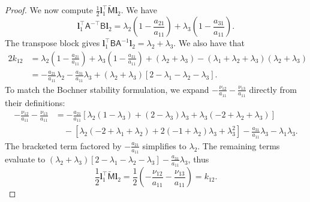 \documentclass{amsart}
\newcommand{\msfA}{\mathsf{A}}
\newcommand{\msfB}{\mathsf{B}}
\newcommand{\msfM}{\mathsf{M}}
\newcommand{\bfl}{\boldsymbol{l}}
\theoremstyle{definition}
\begin{document}
\begin{proof}
  We now compute $\frac{1}{2} \bfl_1^\top \tilde{\msfM} \bfl_2$. We have 
  \[
    \bfl_1^\top \msfA^{-\top} \msfB \bfl_2 = \lambda_2\left(1 - \frac{a_{21}}{a_{11}} \right) + \lambda_3\left(1 - \frac{a_{31}}{a_{11}} \right).
  \]
  The transpose block gives $\bfl_1^\top \msfB \msfA^{-1} \bfl_2 = \lambda_2 + \lambda_3$. We also have that
  \begin{align*}
    2 k_{12} &= \lambda_2\left(1 - \frac{a_{21}}{a_{11}}\right) + \lambda_3\left(1 - \frac{a_{31}}{a_{11}}\right) + (\lambda_2 + \lambda_3) - (\lambda_1+\lambda_2+\lambda_3)(\lambda_2+\lambda_3) \\
    &= -\frac{a_{21}}{a_{11}}\lambda_2 - \frac{a_{31}}{a_{11}}\lambda_3 + (\lambda_2+\lambda_3)\left[ 2 - \lambda_1 - \lambda_2 - \lambda_3 \right].
  \end{align*}
  To match the Bochner stability formulation, we expand $-\frac{\nu_{12}}{a_{11}} - \frac{\nu_{13}}{a_{11}}$ directly from their definitions:
  \begin{align*}
    -\frac{\nu_{12}}{a_{11}} - \frac{\nu_{13}}{a_{11}} &= -\frac{a_{21}}{a_{11}} \left[ \lambda_2(1-\lambda_3) + (2-\lambda_3)\lambda_3 + \lambda_3(-2+\lambda_2+\lambda_3) \right] \\
    &\quad - \left[ \lambda_2(-2+\lambda_1+\lambda_2) + 2(-1+\lambda_2)\lambda_3 + \lambda_3^2 \right] - \frac{a_{31}}{a_{11}}\lambda_3 - \lambda_1\lambda_3.
  \end{align*}
  The bracketed term factored by $-\frac{a_{21}}{a_{11}}$ simplifies to $\lambda_2$. The remaining terms evaluate to $(\lambda_2+\lambda_3)[2 - \lambda_1 - \lambda_2 - \lambda_3] - \frac{a_{31}}{a_{11}}\lambda_3$, thus 
  \[
    \frac{1}{2} \bfl_1^\top \tilde{\msfM} \bfl_2 = \frac{1}{2} \left( -\frac{\nu_{12}}{a_{11}} - \frac{\nu_{13}}{a_{11}} \right) = k_{12}.
  \]


\end{proof}
\end{document}
